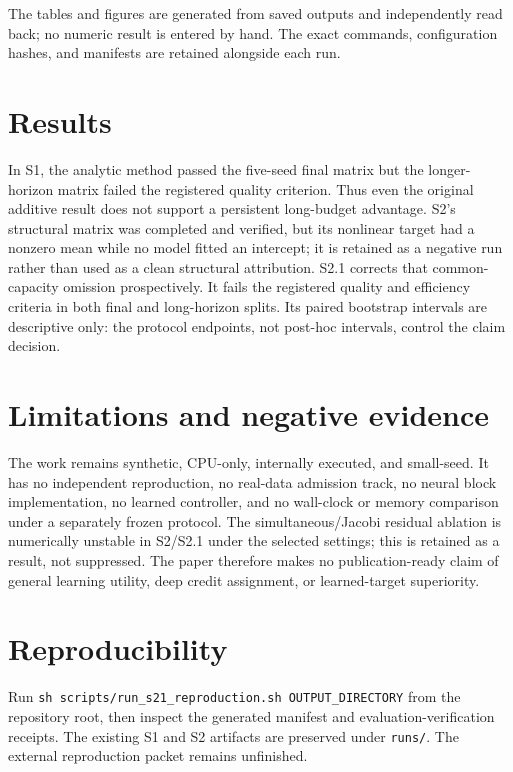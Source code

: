 \documentclass[11pt]{article}
\begin{document}
The tables and figures are generated from saved outputs and independently read back; no numeric result is entered by hand.  The exact commands, configuration hashes, and manifests are retained alongside each run.

\section{Results}


In S1, the analytic method passed the five-seed final matrix but the longer-horizon matrix failed the registered quality criterion.  Thus even the original additive result does not support a persistent long-budget advantage.  S2's structural matrix was completed and verified, but its nonlinear target had a nonzero mean while no model fitted an intercept; it is retained as a negative run rather than used as a clean structural attribution.  S2.1 corrects that common-capacity omission prospectively.  It fails the registered quality and efficiency criteria in both final and long-horizon splits.  Its paired bootstrap intervals are descriptive only: the protocol endpoints, not post-hoc intervals, control the claim decision.

\section{Limitations and negative evidence}
The work remains synthetic, CPU-only, internally executed, and small-seed.  It has no independent reproduction, no real-data admission track, no neural block implementation, no learned controller, and no wall-clock or memory comparison under a separately frozen protocol.  The simultaneous/Jacobi residual ablation is numerically unstable in S2/S2.1 under the selected settings; this is retained as a result, not suppressed.  The paper therefore makes no publication-ready claim of general learning utility, deep credit assignment, or learned-target superiority.

\section{Reproducibility}
Run \texttt{sh scripts/run\_s21\_reproduction.sh OUTPUT\_DIRECTORY} from the repository root, then inspect the generated manifest and evaluation-verification receipts.  The existing S1 and S2 artifacts are preserved under \texttt{runs/}.  The external reproduction packet remains unfinished.



\end{document}
